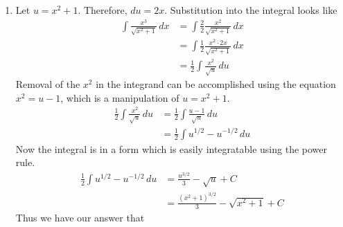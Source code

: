 \documentclass{article}
\begin{document}
\begin{enumerate}[label=\textbf{(5.\arabic*)}]
\begin{enumerate}
    \item Let $u=x^2+1$. Therefore, $du=2x$. Substitution into the integral looks like
    \begin{align*}
        \int\!\frac{x^3}{\sqrt{x^2+1}}\,dx &= \int\!\frac{2}{2}\frac{x^2}{\sqrt{x^2+1}}\,dx \\
        &= \int\!\frac{1}{2}\frac{x^2\cdot2x}{\sqrt{x^2+1}}\,dx \\
        &= \frac{1}{2}\int\!\frac{x^2}{\sqrt{u}}\,du
    \end{align*}
    Removal of the $x^2$ in the integrand can be accomplished using the equation $x^2=u-1$, which is a manipulation of $u=x^2+1$.
    \begin{align*}
        \frac{1}{2}\int\!\frac{x^2}{\sqrt{u}}\,du &= \frac{1}{2}\int\!\frac{u-1}{\sqrt{u}}\,du \\
        &= \frac{1}{2}\int\!u^{1/2}-u^{-1/2}\,du
    \end{align*}
    Now the integral is in a form which is easily integratable using the power rule.
    \begin{align*}
        \frac{1}{2}\int\!u^{1/2}-u^{-1/2}\,du &= \frac{u^{3/2}}{3}-\sqrt{u}+C \\
        &= \frac{{\left(x^2+1\right)}^{3/2}}{3}-\sqrt{x^2+1}+C
    \end{align*}
    Thus we have our answer that 
    

\end{enumerate}
\end{enumerate}
\end{document}
